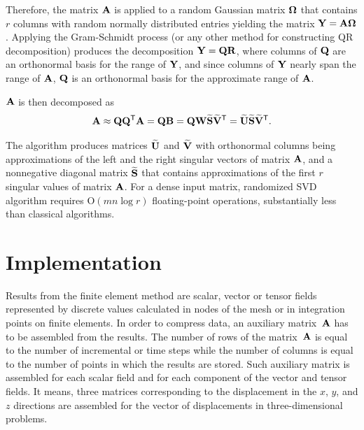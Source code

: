 Therefore, the matrix $\mathbf{A}$ is applied to a random Gaussian matrix $\mathbf{\Omega}$ that contains $r$ columns with random normally distributed entries yielding the matrix $\mathbf{Y} = \mathbf{A} \mathbf{\Omega}$. Applying the Gram-Schmidt process (or any other method for constructing QR decomposition) produces the decomposition $\mathbf{Y}=\mathbf{Q}\mathbf{R}$, where columns of $\mathbf{Q}$ are an orthonormal basis for the range of $\mathbf{Y}$, and since columns of $\mathbf{Y}$ nearly span the range of $\mathbf{A}$, $\mathbf{Q}$ is an orthonormal basis for the approximate range of $\mathbf{A}$.

$\mathbf{A}$ is then decomposed as
\begin{equation}
\mathbf{A} \approx \mathbf{Q}\mathbf{Q}^{\mathsf{T}}\mathbf{A} = \mathbf{Q}\mathbf{B} = \mathbf{Q}\mathbf{W}\mathbf{\widetilde{S}}\mathbf{\widetilde{V}}^{\mathsf{T}} = \mathbf{\widetilde{U}}\mathbf{\widetilde{S}}\mathbf{\widetilde{V}}^{\mathsf{T}}.
\end{equation}

\noindent
The algorithm produces matrices $\mathbf{\widetilde{U}}$ and $\mathbf{\widetilde{V}}$ with orthonormal columns being approximations of the left and the right singular vectors of matrix $\mathbf{A}$, and a nonnegative diagonal matrix $\mathbf{\widetilde{S}}$ that contains approximations of the first $r$ singular values of matrix $\mathbf{A}$. For a dense input matrix, randomized SVD algorithm requires $\mathrm{O}(mn \log{r})$ floating-point operations, substantially less than classical algorithms.



\section{Implementation}


Results from the finite element method are scalar, vector or tensor fields represented by discrete values calculated in nodes of the mesh or in integration points on finite elements. In order to compress data, an auxiliary matrix~$\mathbf{A}$ has to be assembled from the results. The number of rows of the matrix~$\mathbf{A}$ is equal to the number of incremental or time steps while the number of columns is equal to the number of points in which the results are stored. Such auxiliary matrix is assembled for each scalar field and for each component of the vector and tensor fields. It means, three matrices corresponding to the displacement in the $x$, $y$, and $z$ directions are assembled for the vector of displacements in three-dimensional problems.

